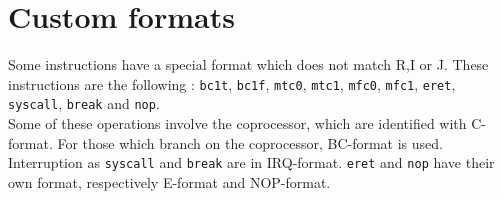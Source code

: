 \section{Custom formats}

	Some instructions have a special format which does not match R,I or J. These instructions are the following : \verb?bc1t?, \verb?bc1f?, \verb?mtc0?, \verb?mtc1?, \verb?mfc0?, \verb?mfc1?, \verb?eret?, \verb?syscall?, \verb?break? and \verb?nop?.\\
	
	 Some of these operations involve the coprocessor, which are identified with C-format. For those which branch on the coprocessor, BC-format is used. Interruption as \verb?syscall? and \verb?break? are in IRQ-format. \verb?eret? and \verb?nop? have their own format, respectively E-format and NOP-format.




